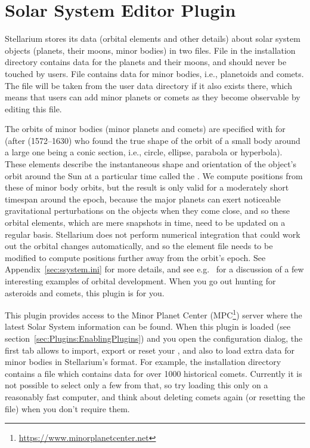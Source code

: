 \newpage

\section{Solar System Editor Plugin}
\label{sec:plugins:SolarSystemEditor}

Stellarium stores its data (orbital elements and other details) about
solar system objects (planets, their moons, minor bodies) in two files.  
File  in the installation directory contains data for the planets and their moons, and should never be touched by users.
File  contains data for minor bodies, i.e., planetoids and comets.
The file will be taken from the user data directory if it also exists there, which means that users can add minor planets or comets as they become observable by editing this file.

The orbits of minor bodies (minor planets and comets) are specified with  for 
 (after  (1572--1630) who found the true shape of the orbit 
of a small body around a large one being a conic section, i.e., circle, ellipse, parabola or hyperbola). These elements 
describe the instantaneous shape and orientation of the object's orbit around the Sun at a particular time 
called the .  
We compute positions from these  of minor body orbits, but the result is only valid for 
a moderately short timespan around the epoch, because the major planets can exert noticeable gravitational perturbations 
on the objects when they come close, and so these orbital elements, which are mere snapshots in time, need to be updated on a regular basis. 
Stellarium does not perform numerical integration that could work out the orbital changes automatically, 
and so the element file needs to be modified to compute positions further away from the orbit's epoch. 
See Appendix~\ref{sec:ssystem.ini} for more details, 
and see e.g.\ \citet{Meeus:Morsels4} for a discussion of a few interesting examples of orbital development.
When you go out hunting for asteroids and comets, this plugin is for you.

This plugin provides access to the Minor Planet Center (MPC\footnote{\url{https://www.minorplanetcenter.net}}) server where the latest Solar System information can be found. When this plugin is
loaded (see section~\ref{sec:Plugins:EnablingPlugins}) and you open the configuration dialog, the first tab allows to import, export or reset your , 
and also to load extra data for minor bodies in Stellarium's  format. 
For example, the installation directory contains a file  which contains 
data for over 1000 historical comets. Currently it is not possible to select only a few from that, 
so try loading this only on a reasonably fast computer, and think about deleting comets again (or resetting the file) when you don't require them.

